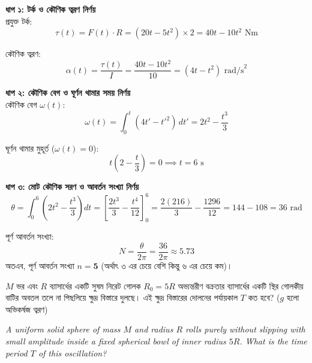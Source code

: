 \documentclass[12pt, a4paper]{article}
\begin{document}
\begin{tcolorbox}[solutionbox={সমাধান (Solution)}]
\noindent
\textbf{ধাপ ১: টর্ক ও কৌণিক ত্বরণ নির্ণয়} \\
প্রযুক্ত টর্ক:
\[\tau(t) = F(t) \cdot R = (20t - 5t^2) \times 2 = 40t - 10t^2\text{ Nm}\]

কৌণিক ত্বরণ:
\[\alpha(t) = \frac{\tau(t)}{I} = \frac{40t - 10t^2}{10} = (4t - t^2)\text{ rad/s}^2\]

\vspace{0.5em}
\noindent\textbf{ধাপ ২: কৌণিক বেগ ও ঘূর্ণন থামার সময় নির্ণয়} \\
কৌণিক বেগ $\omega(t)$:
\[\omega(t) = \int_0^t (4t' - t'^2) \, dt' = 2t^2 - \frac{t^3}{3}\]

ঘূর্ণন থামার মুহূর্ত ($\omega(t) = 0$):
\[t \left(2 - \frac{t}{3}\right) = 0 \implies t = 6\text{ s}\]

\vspace{0.5em}
\noindent\textbf{ধাপ ৩: মোট কৌণিক সরণ ও আবর্তন সংখ্যা নির্ণয়} \\
\[\theta = \int_0^6 \left(2t^2 - \frac{t^3}{3}\right) dt = \left[\frac{2t^3}{3} - \frac{t^4}{12}\right]_0^6 = \frac{2(216)}{3} - \frac{1296}{12} = 144 - 108 = 36\text{ rad}\]

পূর্ণ আবর্তন সংখ্যা:
\[N = \frac{\theta}{2\pi} = \frac{36}{2\pi} \approx 5.73\]
অতএব, পূর্ণ আবর্তন সংখ্যা $n = \mathbf{5}$ (অর্থাৎ ৩ এর চেয়ে বেশি কিন্তু ৬ এর চেয়ে কম)।
\end{tcolorbox}

\vspace{2em}

\begin{tcolorbox}[questionbox={প্রশ্ন (Question) 7}]
\noindent
$M$ ভর এবং $R$ ব্যাসার্ধের একটি সুষম নিরেট গোলক $R_0 = 5R$ অভ্যন্তরীণ বক্রতার ব্যাসার্ধের একটি স্থির গোলকীয় বাটির অবতল তলে না পিছলিয়ে ক্ষুদ্র বিস্তারে দুলছে। এই ক্ষুদ্র বিস্তারের দোলনের পর্যায়কাল $T$ কত হবে? ($g$ হলো অভিকর্ষজ ত্বরণ)
\vspace{0.8em}
\begin{english}
\noindent\textit{\color{darkgray}
A uniform solid sphere of mass $M$ and radius $R$ rolls purely without slipping with small amplitude inside a fixed spherical bowl of inner radius $5R$. What is the time period $T$ of this oscillation?
}
\end{english}
\end{tcolorbox}
\end{document}

